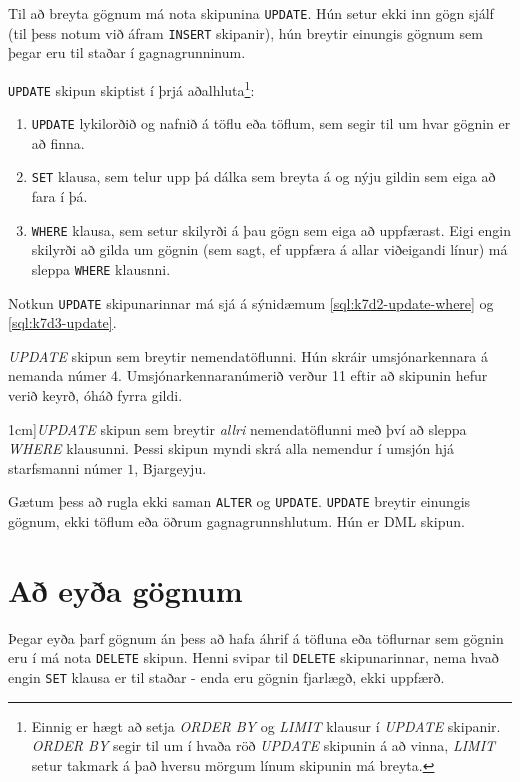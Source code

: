 Til að breyta gögnum má nota skipunina \verb|UPDATE|. Hún setur ekki inn gögn sjálf (til þess notum við áfram \verb|INSERT| skipanir), hún breytir einungis gögnum sem þegar eru til staðar í gagnagrunninum.

\verb|UPDATE| skipun skiptist í þrjá aðalhluta\footnote{Einnig er hægt að setja \emph{ORDER BY} og \emph{LIMIT} klausur í \emph{UPDATE} skipanir. \emph{ORDER BY} segir til um í hvaða röð \emph{UPDATE} skipunin á að vinna, \emph{LIMIT} setur takmark á það hversu mörgum línum skipunin má breyta.}:
\begin{enumerate}
 \item \verb|UPDATE| lykilorðið og nafnið á töflu eða töflum, sem segir til um hvar gögnin er að finna.
 \item \verb|SET| klausa, sem telur upp þá dálka sem breyta á og nýju gildin sem eiga að fara í þá.
 \item \verb|WHERE| klausa, sem setur skilyrði á þau gögn sem eiga að uppfærast. Eigi engin skilyrði að gilda um gögnin (sem sagt, ef uppfæra á allar viðeigandi línur) má sleppa \verb|WHERE| klausnni. 
\end{enumerate}
Notkun \verb|UPDATE| skipunarinnar má sjá á sýnidæmum \ref{sql:k7d2-update-where} og \ref{sql:k7d3-update}.

\begin{example}
\caption[UPDATE með WHERE]{\emph{UPDATE} skipun sem breytir nemendatöflunni. Hún skráir umsjónarkennara á nemanda númer 4. Umsjónarkennaranúmerið verður 11 eftir að skipunin hefur verið keyrð, óháð fyrra gildi.}
\label{sql:k7d2-update-where}
\centering
{}
\end{example}

\begin{example}
\caption[UPDATE án WHERE][1cm]{\emph{UPDATE} skipun sem breytir \emph{allri} nemendatöflunni með því að sleppa \emph{WHERE} klausunni. Þessi skipun myndi skrá alla nemendur í umsjón hjá starfsmanni númer $1$, Bjargeyju.}
\vspace{1cm}
\label{sql:k7d3-update}
\centering
{}
\end{example}

Gætum þess að rugla ekki saman \verb|ALTER| og \verb|UPDATE|. \verb|UPDATE| breytir einungis gögnum, ekki töflum eða öðrum gagnagrunnshlutum. Hún er DML skipun.
\section{Að eyða gögnum}
Þegar eyða þarf gögnum án þess að hafa áhrif á töfluna eða töflurnar sem gögnin eru í má nota \verb|DELETE| skipun. Henni svipar til \verb|DELETE| skipunarinnar, nema hvað engin \verb|SET| klausa er til staðar - enda eru gögnin fjarlægð, ekki uppfærð.

